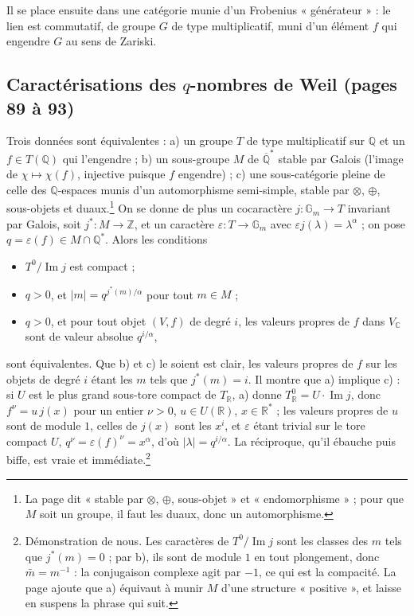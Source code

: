 \documentclass[11pt,a4paper]{article}
\begin{document}
Il se place ensuite dans une catégorie munie d'un Frobenius « générateur » : le
lien est commutatif, de groupe $G$ de type multiplicatif, muni d'un élément $f$
qui engendre $G$ au sens de Zariski.

\subsection*{Caractérisations des $q$-nombres de Weil (pages 89 à 93)}

Trois données sont équivalentes : a) un groupe $T$ de type multiplicatif sur
$\mathbb{Q}$ et un $f \in T(\mathbb{Q})$ qui l'engendre ; b) un sous-groupe $M$
de $\overline{\mathbb{Q}}^{*}$ stable par Galois (l'image de $\chi \mapsto
\chi(f)$, injective puisque $f$ engendre) ; c) une sous-catégorie pleine de celle
des $\mathbb{Q}$-espaces munis d'un automorphisme semi-simple, stable par
$\otimes$, $\oplus$, sous-objets et duaux.\footnote{La page dit « stable par
$\otimes$, $\oplus$, sous-objet » et « endomorphisme » ; pour que $M$ soit un
groupe, il faut les duaux, donc un automorphisme.} On se donne de plus un
cocaractère $j \colon \mathbb{G}_{m} \to T$ invariant par Galois, soit
$j^{*} \colon M \to \mathbb{Z}$, et un caractère $\varepsilon \colon T \to
\mathbb{G}_{m}$ avec $\varepsilon j(\lambda) = \lambda^{\alpha}$ ; on pose $q =
\varepsilon(f) \in M \cap \mathbb{Q}^{*}$. Alors les conditions
\begin{itemize}
  \item[a)] $T^{0}/\operatorname{Im} j$ est compact ;
  \item[b)] $q > 0$, et $|m| = q^{j^{*}(m)/\alpha}$ pour tout $m \in M$ ;
  \item[c)] $q > 0$, et pour tout objet $(V, f)$ de degré $i$, les valeurs
  propres de $f$ dans $V_{\mathbb{C}}$ sont de valeur absolue $q^{i/\alpha}$,
\end{itemize}
sont équivalentes. Que b) et c) le soient est clair, les valeurs propres de $f$
sur les objets de degré $i$ étant les $m$ tels que $j^{*}(m) = i$. Il montre que
a) implique c) : si $U$ est le plus grand sous-tore compact de $T_{\mathbb{R}}$,
a) donne $T^{0}_{\mathbb{R}} = U \cdot \operatorname{Im} j$, donc $f^{\nu} = u\,
j(x)$ pour un entier $\nu > 0$, $u \in U(\mathbb{R})$, $x \in \mathbb{R}^{*}$ ;
les valeurs propres de $u$ sont de module $1$, celles de $j(x)$ sont les $x^{i}$,
et $\varepsilon$ étant trivial sur le tore compact $U$, $q^{\nu} =
\varepsilon(f)^{\nu} = x^{\alpha}$, d'où $|\lambda| = q^{i/\alpha}$. La
réciproque, qu'il ébauche puis biffe, est vraie et
immédiate.\footnote{Démonstration de nous. Les caractères de
$T^{0}/\operatorname{Im} j$ sont les classes des $m$ tels que $j^{*}(m) = 0$ ;
par b), ils sont de module $1$ en tout plongement, donc $\bar{m} = m^{-1}$ : la
conjugaison complexe agit par $-1$, ce qui est la compacité. La page ajoute que
a) équivaut à munir $M$ d'une structure « positive », et laisse en suspens la
phrase qui suit.}
\end{document}
